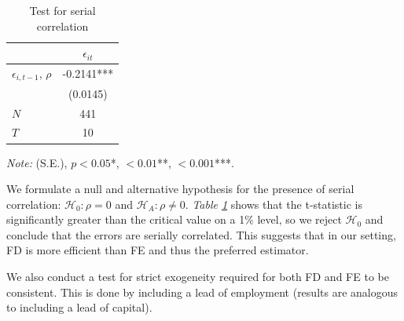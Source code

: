 \documentclass[11pt]{article}
\begin{document}
\begin{table}[H]
    \centering
    \caption{Test for serial correlation}
    \label{tab:Serial_corr}
    \begin{threeparttable}
        \begin{tabular}{lc}
        \toprule
                     & $\epsilon_{it}$ \\
        \midrule
        $\epsilon_{i,t-1}$, $\rho$    &         -0.2141*** \\
                     &           (0.0145) \\
        \midrule
        $N$          & 441  \\
        $T$          & 10 \\
        \bottomrule
        \end{tabular}
        \begin{tablenotes}
           \footnotesize \textit{Note:} (S.E.), $p<0.05$*, $<0.01$**, $<0.001$***.
        \end{tablenotes}
    \end{threeparttable}
\end{table}

We formulate a null and alternative hypothesis for the presence of serial correlation: $\mathcal{H}_0:\rho=0$ and $\mathcal{H}_A:\rho\ne0$. 
\textit{Table \ref{tab:Serial_corr}} shows that the t-statistic is significantly greater than the critical value on a 1\% level, so we reject $\mathcal{H}_0$ and conclude that the errors are serially correlated. This suggests that in our setting, FD is more efficient than FE and thus the preferred estimator. 

We also conduct a test for strict exogeneity required for both FD and FE to be consistent. This is done by including a lead of employment (results are analogous to including a lead of capital). 
\end{document}
